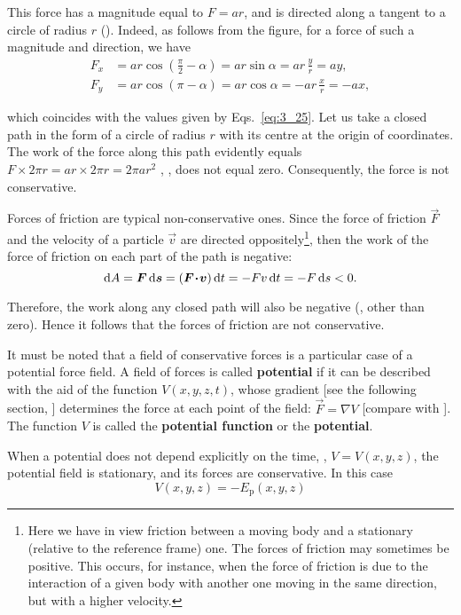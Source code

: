 \noindent
This force has a magnitude equal to $F=ar$, and is directed along a tangent to a circle of radius $r$ (). Indeed, as follows from the figure, for a force of such a magnitude and direction, we have
\begin{align*}
F_x &= ar\cos\left(\frac{\pi}{2}-\alpha\right) = ar\sin\alpha = ar\,\frac{y}{r} = ay,\\
F_y &= ar\cos(\pi-\alpha) = ar\cos\alpha = -ar\,\frac{x}{r} = -ax,
\end{align*}

\noindent
which coincides with the values given by Eqs.~\eqref{eq:3_25}. Let us take a closed path in the form of a circle of radius $r$ with its centre at the origin of coordinates. The work of the force along this path evidently equals $F\times 2\pi r=ar\times 2\pi r=2\pi ar^2$ , \ie, does not equal zero. Consequently, the force is not conservative.

Forces of friction are typical non-conservative ones. Since the force of friction $\vec{F}$ and the velocity of a particle $\vec{v}$ are directed oppositely\footnote{Here we have in view friction between a moving body and a stationary (relative to the reference frame) one. The forces of friction may sometimes be positive. This occurs, for instance, when the force of friction is due to the interaction of a given body with another one moving in the same direction, but with a higher velocity.}, then the work of the force of friction on each part of the path is negative:
\begin{equation*}
\mathrm{d} A = \boldsymbol{F}\,\mathrm{d}\boldsymbol{s} = (\boldsymbol{F\!\cdot\!v})\,\mathrm{d} t = -Fv\,\mathrm{d} t = -F\,\mathrm{d} s<0.
\end{equation*}

\noindent
Therefore, the work along any closed path will also be negative (\ie, other than zero). Hence it follows that the forces of friction are not conservative.

It must be noted that a field of conservative forces is a particular case of a potential force field. A field of forces is called \textbf{potential} if it can be described with the aid of the function $V(x,y,z,t)$, whose gradient [see the following section, ] determines the force at each point of the field: $\vec{F}=\nabla V$ [compare with ]. The function $V$ is called the \textbf{potential function} or the \textbf{potential}.

When a potential does not depend explicitly on the time, \ie, $V=V(x,y,z)$, the potential field is stationary, and its forces are conservative. In this case
\begin{equation*}
V(x,y,z) = -E_{\text{p}}(x,y,z)
\end{equation*}

